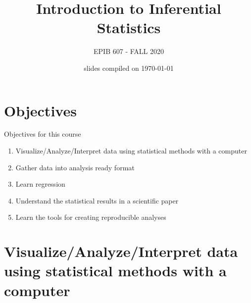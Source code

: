 \documentclass{beamer}\usepackage[]{graphicx}\usepackage[]{color}
\begin{document}

\title{Introduction to Inferential Statistics}
\author{EPIB 607 - FALL 2020}

\date{slides compiled on \today}

\maketitle

\section{Objectives}


\begin{frame}{Objectives for this course}

\begin{enumerate}[<+->]

\item Visualize/Analyze/Interpret data using statistical methods with a computer
\item Gather data into analysis ready format
\item Learn regression
\item Understand the statistical results in a scientific paper
\item Learn the tools for creating reproducible analyses

\end{enumerate}

\end{frame}



\section{Visualize/Analyze/Interpret data using statistical methods with a computer}
\end{document}
